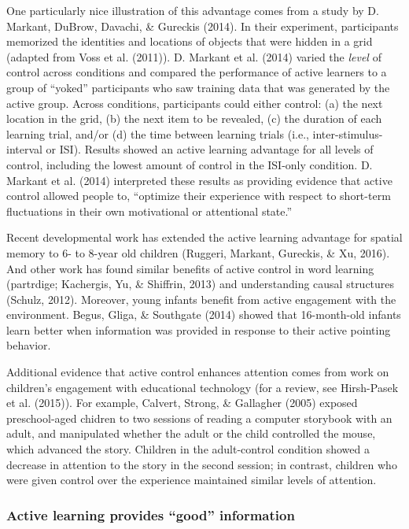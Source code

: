 \documentclass[a4paper,man,apacite,floatsintext]{apa6}
\begin{document}
One particularly nice illustration of this advantage comes from a study
by D. Markant, DuBrow, Davachi, \& Gureckis (2014). In their experiment,
participants memorized the identities and locations of objects that were
hidden in a grid (adapted from Voss et al. (2011)). D. Markant et al.
(2014) varied the \emph{level} of control across conditions and compared
the performance of active learners to a group of ``yoked'' participants
who saw training data that was generated by the active group. Across
conditions, participants could either control: (a) the next location in
the grid, (b) the next item to be revealed, (c) the duration of each
learning trial, and/or (d) the time between learning trials (i.e.,
inter-stimulus-interval or ISI). Results showed an active learning
advantage for all levels of control, including the lowest amount of
control in the ISI-only condition. D. Markant et al. (2014) interpreted
these results as providing evidence that active control allowed people
to, ``optimize their experience with respect to short-term fluctuations
in their own motivational or attentional state.''

Recent developmental work has extended the active learning advantage for
spatial memory to 6- to 8-year old children (Ruggeri, Markant, Gureckis,
\& Xu, 2016). And other work has found similar benefits of active
control in word learning (partrdige; Kachergis, Yu, \& Shiffrin, 2013)
and understanding causal structures (Schulz, 2012). Moreover, young
infants benefit from active engagement with the environment. Begus,
Gliga, \& Southgate (2014) showed that 16-month-old infants learn better
when information was provided in response to their active pointing
behavior.

Additional evidence that active control enhances attention comes from
work on children's engagement with educational technology (for a review,
see Hirsh-Pasek et al. (2015)). For example, Calvert, Strong, \&
Gallagher (2005) exposed preschool-aged chidren to two sessions of
reading a computer storybook with an adult, and manipulated whether the
adult or the child controlled the mouse, which advanced the story.
Children in the adult-control condition showed a decrease in attention
to the story in the second session; in contrast, children who were given
control over the experience maintained similar levels of attention.

\subsubsection{\texorpdfstring{Active learning provides ``good''
information}{Active learning provides good information}}\label{active-learning-provides-good-information}
\end{document}
